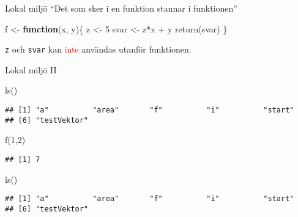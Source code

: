 \documentclass[
  10pt,
  ignorenonframetext,
]{beamer}
\newenvironment{Shaded}{\begin{snugshade}}{\end{snugshade}}
\newcommand{\ControlFlowTok}[1]{\textcolor[rgb]{0.13,0.29,0.53}{\textbf{#1}}}
\newcommand{\DecValTok}[1]{\textcolor[rgb]{0.00,0.00,0.81}{#1}}
\newcommand{\FunctionTok}[1]{\textcolor[rgb]{0.00,0.00,0.00}{#1}}
\newcommand{\NormalTok}[1]{#1}
\newcommand{\OtherTok}[1]{\textcolor[rgb]{0.56,0.35,0.01}{#1}}
\newcommand{\SpecialCharTok}[1]{\textcolor[rgb]{0.00,0.00,0.00}{#1}}
\begin{document}
\begin{frame}[fragile]{Lokal miljö}
\protect\hypertarget{lokal-miljuxf6}{}
``Det som sker i en funktion stannar i funktionen''

\begin{Shaded}
\begin{Highlighting}[]
\NormalTok{f }\OtherTok{\textless{}{-}} \ControlFlowTok{function}\NormalTok{(x, y)\{}
\NormalTok{  z }\OtherTok{\textless{}{-}} \DecValTok{5}
\NormalTok{  svar }\OtherTok{\textless{}{-}}\NormalTok{ z}\SpecialCharTok{*}\NormalTok{x }\SpecialCharTok{+}\NormalTok{ y }
  \FunctionTok{return}\NormalTok{(svar)}
\NormalTok{\}}
\end{Highlighting}
\end{Shaded}

\texttt{z} och \texttt{svar} kan \textcolor{red}{inte} användas utanför
funktionen.
\end{frame}

\begin{frame}[fragile]{Lokal miljö II}
\protect\hypertarget{lokal-miljuxf6-ii}{}
\begin{Shaded}
\begin{Highlighting}[]
\FunctionTok{ls}\NormalTok{()}
\end{Highlighting}
\end{Shaded}

\begin{verbatim}
## [1] "a"          "area"       "f"          "i"          "start"     
## [6] "testVektor"
\end{verbatim}

\begin{Shaded}
\begin{Highlighting}[]
\FunctionTok{f}\NormalTok{(}\DecValTok{1}\NormalTok{,}\DecValTok{2}\NormalTok{)}
\end{Highlighting}
\end{Shaded}

\begin{verbatim}
## [1] 7
\end{verbatim}

\begin{Shaded}
\begin{Highlighting}[]
\FunctionTok{ls}\NormalTok{()}
\end{Highlighting}
\end{Shaded}

\begin{verbatim}
## [1] "a"          "area"       "f"          "i"          "start"     
## [6] "testVektor"
\end{verbatim}
\end{frame}
\end{document}
